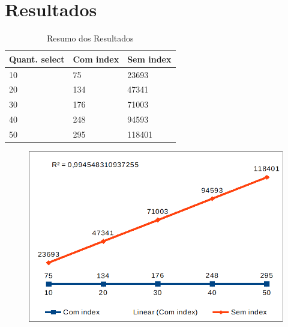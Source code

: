 \documentclass[12pt,a4paper]{article}
\begin{document}
\section{Resultados}
\begin{table}[ht]
\centering
\caption{Resumo dos Resultados}
\label{my-label}
\begin{tabular}{|l|l|l|}
\hline
\rowcolor[HTML]{00009B} 
{\color[HTML]{000000} \textbf{Quant. select}} & {\color[HTML]{000000} \textbf{Com index}} & {\color[HTML]{000000} \textbf{Sem index}} \\ \hline
10                                            & 75                                        & 23693                                     \\ \hline
20                                            & 134                                       & 47341                                     \\ \hline
30                                            & 176                                       & 71003                                     \\ \hline
40                                            & 248                                       & 94593                                     \\ \hline
50                                            & 295                                       & 118401                                    \\ \hline
\end{tabular}
\end{table}

\begin{figure}[ht]
	\label{figura:grafico}
	\centering
	\includegraphics[width=15cm]{recursos/imagens/grafico.png} 
\end{figure}
\end{document}
